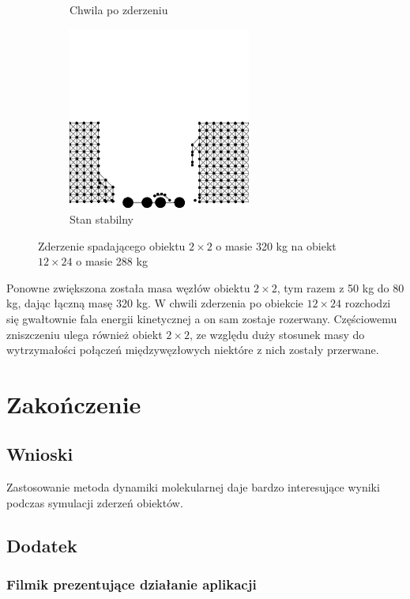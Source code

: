 \documentclass[12pt, letterpaper]{report}
\begin{document}
\begin{figure}[h]
\begin{subfigure}{0.5\textwidth}
            \caption{Chwila po zderzeniu}
        \end{subfigure}
        \begin{subfigure}{0.5\textwidth}
            \centering
            \includegraphics[width=6cm, height=6cm]{collision_2x2_24x12_mass80_4}
            \caption{Stan stabilny}
        \end{subfigure}
        
        \caption{Zderzenie spadającego obiektu $2 \times 2$ o masie 320 kg na obiekt $12 \times 24$ o masie 288 kg}
    \end{figure}

    Ponowne zwiększona została masa węzłów obiektu $2 \times 2$, tym razem z 50 kg do 80 kg, dając łączną masę 320 kg.
    W chwili zderzenia po obiekcie $12 \times 24$ rozchodzi się gwałtownie fala energii kinetycznej a on sam zostaje 
    rozerwany. Częściowemu zniszczeniu ulega również obiekt $2 \times 2$, ze względu duży stosunek masy do wytrzymałości
    połączeń międzywęzłowych niektóre z nich zostały przerwane.

\chapter{Zakończenie}
    \section{Wnioski}
    Zastosowanie metoda dynamiki molekularnej daje bardzo interesujące 
    wyniki podczas symulacji zderzeń obiektów.

    \section{Dodatek}

    \subsection{Filmik prezentujące działanie aplikacji}
\end{document}
